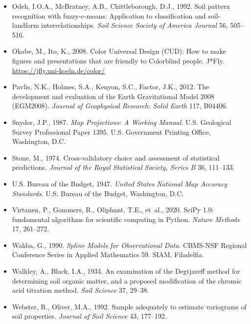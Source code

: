 \documentclass[10pt]{article}
\begin{document}
{\begin{itemize}[label={}, leftmargin=1.2em, itemindent=-1.2em, itemsep=0.45em]
  \item Odeh, I.O.A., McBratney, A.B., Chittleborough, D.J., 1992. Soil pattern recognition with fuzzy-c-means: Application to classification and soil-landform interrelationships. \emph{Soil Science Society of America Journal} 56, 505–516.
  \item Okabe, M., Ito, K., 2008. Color Universal Design (CUD): How to make figures and presentations that are friendly to Colorblind people. J*Fly. \url{https://jfly.uni-koeln.de/color/}
  \item Pavlis, N.K., Holmes, S.A., Kenyon, S.C., Factor, J.K., 2012. The development and evaluation of the Earth Gravitational Model 2008 (EGM2008). \emph{Journal of Geophysical Research: Solid Earth} 117, B04406.
  \item Snyder, J.P., 1987. \emph{Map Projections: A Working Manual}. U.S. Geological Survey Professional Paper 1395. U.S. Government Printing Office, Washington, D.C.
  \item Stone, M., 1974. Cross-validatory choice and assessment of statistical predictions. \emph{Journal of the Royal Statistical Society, Series B} 36, 111–133.
  \item U.S. Bureau of the Budget, 1947. \emph{United States National Map Accuracy Standards}. U.S. Bureau of the Budget, Washington, D.C.
  \item Virtanen, P., Gommers, R., Oliphant, T.E., et~al., 2020. SciPy 1.0: fundamental algorithms for scientific computing in Python. \emph{Nature Methods} 17, 261–272.
  \item Wahba, G., 1990. \emph{Spline Models for Observational Data}. CBMS-NSF Regional Conference Series in Applied Mathematics 59. SIAM, Filadelfia.
  \item Walkley, A., Black, I.A., 1934. An examination of the Degtjareff method for determining soil organic matter, and a proposed modification of the chromic acid titration method. \emph{Soil Science} 37, 29–38.
  \item Webster, R., Oliver, M.A., 1992. Sample adequately to estimate variograms of soil properties. \emph{Journal of Soil Science} 43, 177–192.
\end{itemize}
}
\end{document}
